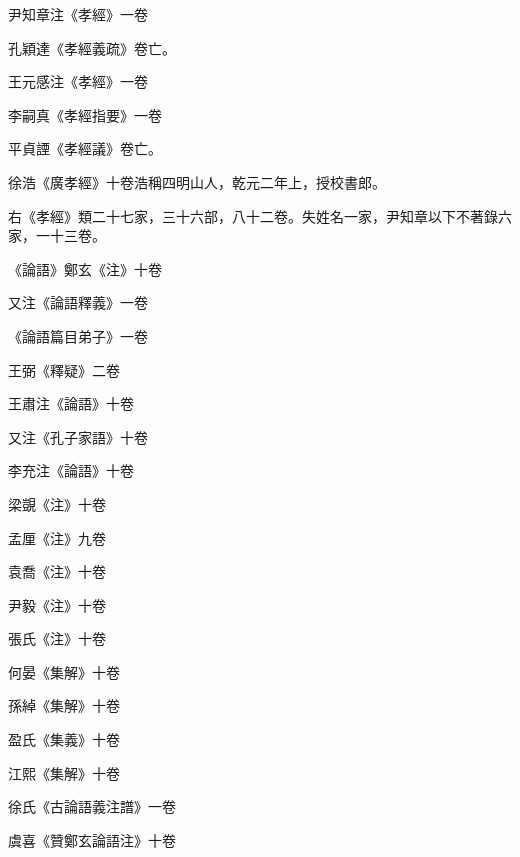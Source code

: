 \begin{pinyinscope}
 尹知章注《孝經》一卷



 孔穎達《孝經義疏》卷亡。



 王元感注《孝經》一卷



 李嗣真《孝經指要》一卷



 平貞諲《孝經議》卷亡。



 徐浩《廣孝經》十卷浩稱四明山人，乾元二年上，授校書郎。



 右《孝經》類二十七家，三十六部，八十二卷。失姓名一家，尹知章以下不著錄六家，一十三卷。



 《論語》鄭玄《注》十卷



 又注《論語釋義》一卷



 《論語篇目弟子》一卷



 王弼《釋疑》二卷



 王肅注《論語》十卷



 又注《孔子家語》十卷



 李充注《論語》十卷



 梁覬《注》十卷



 孟厘《注》九卷



 袁喬《注》十卷



 尹毅《注》十卷



 張氏《注》十卷



 何晏《集解》十卷



 孫綽《集解》十卷



 盈氏《集義》十卷



 江熙《集解》十卷



 徐氏《古論語義注譜》一卷



 虞喜《贊鄭玄論語注》十卷




\end{pinyinscope}
